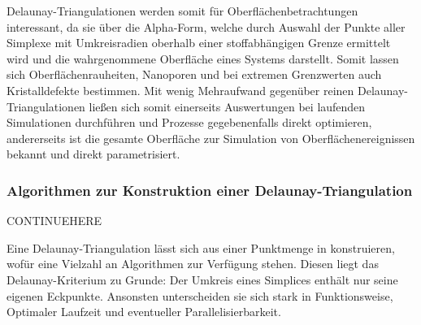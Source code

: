 Delaunay-Triangulationen werden somit für Oberflächenbetrachtungen interessant, da sie über die Alpha-Form, welche durch Auswahl der Punkte aller Simplexe mit Umkreisradien oberhalb einer stoffabhängigen Grenze ermittelt wird und die wahrgenommene Oberfläche eines Systems darstellt.
Somit lassen sich Oberflächenrauheiten, Nanoporen und bei extremen Grenzwerten auch Kristalldefekte bestimmen.
Mit wenig Mehraufwand gegenüber reinen Delaunay-Triangulationen ließen sich somit einerseits Auswertungen bei laufenden Simulationen durchführen und Prozesse gegebenenfalls direkt optimieren, andererseits ist die gesamte Oberfläche zur Simulation von Oberflächenereignissen bekannt und direkt parametrisiert.

\subsubsection{Algorithmen zur Konstruktion einer Delaunay-Triangulation}

CONTINUEHERE

Eine Delaunay-Triangulation lässt sich aus einer Punktmenge in  konstruieren, wofür eine Vielzahl an Algorithmen zur Verfügung stehen. 
Diesen liegt das Delaunay-Kriterium zu Grunde:
Der Umkreis eines Simplices enthält nur seine eigenen Eckpunkte.
Ansonsten unterscheiden sie sich stark in Funktionsweise, Optimaler Laufzeit  und eventueller Parallelisierbarkeit.

